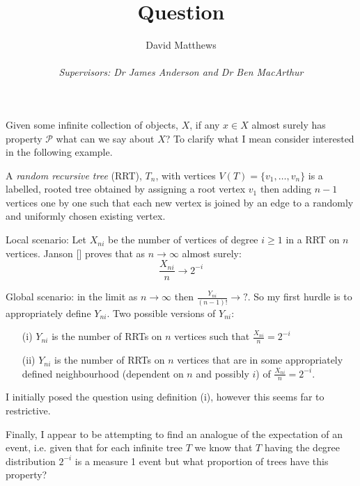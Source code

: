 \documentclass[12pt]{article} %
\title{Question}
\author{David Matthews \\\\\emph{Supervisors: Dr James Anderson and Dr Ben MacArthur}}
\theoremstyle{definition}
\begin{document}
 
 Given some infinite collection of objects, $X$, if any $x \in X$ almost surely has property $\mathcal{P}$ what can we say about $X$?  To clarify what I mean consider interested in the following example.
 
 A \emph{random recursive tree} (RRT), $T_{n}$, with vertices $V(T) = \{v_{1},\dots,v_{n}\}$ is a labelled, rooted tree obtained by assigning a root vertex $v_{1}$ then adding $n-1$ vertices one by one such that each new vertex is joined by an edge to a randomly and uniformly chosen existing vertex.
 
 Local scenario:  Let $X_{ni}$ be the number of vertices of degree $i \geq 1$ in a RRT on $n$ vertices.  Janson [] proves that as $n \rightarrow \infty$ almost surely:
 \[\frac{X_{ni}}{n} \rightarrow 2^{-i}\]
 
 Global scenario:  in the limit as $n \rightarrow \infty$ then $\frac{Y_{ni}}{(n-1)!} \rightarrow ?$.  So my first hurdle is to appropriately define $Y_{ni}$.  Two possible versions of $Y_{ni}$:
 \begin{itemize}
  \item[(i)] $Y_{ni}$ is the number of RRTs on $n$ vertices such that $\frac{X_{ni}}{n} = 2^{-i}$ 
  \item[(ii)] $Y_{ni}$ is the number of RRTs on $n$ vertices that are in some appropriately defined neighbourhood (dependent on $n$ and possibly $i$) of $\frac{X_{ni}}{n} = 2^{-i}$. 
 \end{itemize}
I initially posed the question using definition (i), however this seems far to restrictive. 

Finally, I appear to be attempting to find an analogue of the expectation of an event, i.e. given that for each infinite tree $T$ we know that $T$ having the  degree distribution $2^{-i}$ is a measure 1 event but what proportion of trees have this property?      
 
\end{document}
